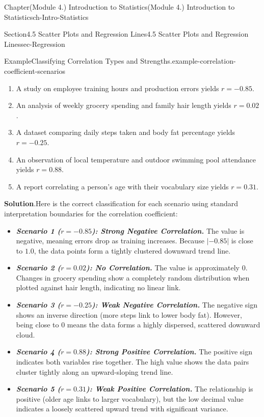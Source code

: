 \documentclass[oneside,10pt,]{book}
\newcommand{\blocktitlefont}{\relax}
\newcommand{\ptxlistdisc}{\raisebox{0.3ex}{\textbullet}}
\newcommand{\alert}[1]{\textbf{\textit{#1}}}
\begin{document}
\begin{chapterptx}{Chapter}{(Module 4.) Introduction to Statistics}{}{(Module 4.) Introduction to Statistics}{}{}{ch-Intro-Statistics}
\begin{sectionptx}{Section}{4.5 Scatter Plots and Regression Lines}{}{4.5 Scatter Plots and Regression Lines}{}{}{sec-Regression}
\begin{example}{Example}{Classifying Correlation Types and Strengths.}{example-correlation-coefficient-scenarios}
\par
%
\begin{enumerate}[label={\arabic*}]
\item{}A study on employee training hours and production errors yields \(r = -0.85\).%
\item{}An analysis of weekly grocery spending and family hair length yields \(r = 0.02\).%
\item{}A dataset comparing daily steps taken and body fat percentage yields \(r = -0.25\).%
\item{}An observation of local temperature and outdoor swimming pool attendance yields \(r = 0.88\).%
\item{}A report correlating a person's age with their vocabulary size yields \(r = 0.31\).%
\end{enumerate}
%
\par\smallskip%
\noindent\textbf{\blocktitlefont Solution}.\hypertarget{example-correlation-coefficient-scenarios-3}{}\quad{}Here is the correct classification for each scenario using standard interpretation boundaries for the correlation coefficient:%
\par
%
\begin{itemize}[label=\ptxlistdisc]
\item{}\alert{Scenario 1 (\(r = -0.85\)): Strong Negative Correlation.} The value is negative, meaning errors drop as training increases. Because \(|-0.85|\) is close to \(1.0\), the data points form a tightly clustered downward trend line.%
\item{}\alert{Scenario 2 (\(r = 0.02\)): No Correlation.} The value is approximately \(0\). Changes in grocery spending show a completely random distribution when plotted against hair length, indicating no linear link.%
\item{}\alert{Scenario 3 (\(r = -0.25\)): Weak Negative Correlation.} The negative sign shows an inverse direction (more steps link to lower body fat). However, being close to \(0\) means the data forms a highly dispersed, scattered downward cloud.%
\item{}\alert{Scenario 4 (\(r = 0.88\)): Strong Positive Correlation.} The positive sign indicates both variables rise together. The high value shows the data pairs cluster tightly along an upward-sloping trend line.%
\item{}\alert{Scenario 5 (\(r = 0.31\)): Weak Positive Correlation.} The relationship is positive (older age links to larger vocabulary), but the low decimal value indicates a loosely scattered upward trend with significant variance.%

\end{itemize}
\end{example}
\end{sectionptx}
\end{chapterptx}
\end{document}
